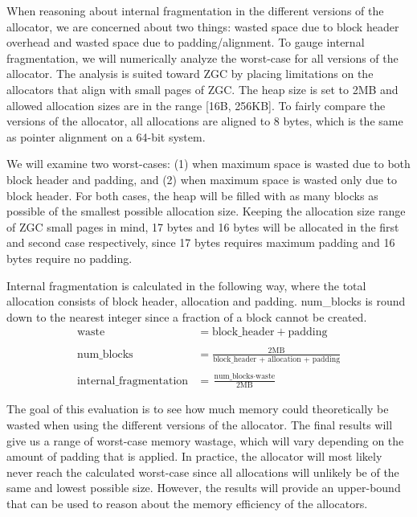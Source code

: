 When reasoning about internal fragmentation in the different versions of the allocator, we are concerned about two things: wasted space due to block header overhead and wasted space due to padding/alignment. To gauge internal fragmentation, we will numerically analyze the worst-case for all versions of the allocator. The analysis is suited toward ZGC by placing limitations on the allocators that align with small pages of ZGC. The heap size is set to 2MB and allowed allocation sizes are in the range [16B, 256KB]. To fairly compare the versions of the allocator, all allocations are aligned to 8 bytes, which is the same as pointer alignment on a 64-bit system.

We will examine two worst-cases: (1) when maximum space is wasted due to both block header and padding, and (2) when maximum space is wasted only due to block header. For both cases, the heap will be filled with as many blocks as possible of the smallest possible allocation size. Keeping the allocation size range of ZGC small pages in mind, 17 bytes and 16 bytes will be allocated in the first and second case respectively, since 17 bytes requires maximum padding and 16 bytes require no padding.

Internal fragmentation is calculated in the following way, where the total allocation consists of block header, allocation and padding. num\_blocks is round down to the nearest integer since a fraction of a block cannot be created.
\begin{align*}
    \text{waste} &= \text{block\_header} + \text{padding} \\\\
    \text{num\_blocks} &= \frac{2\text{MB}}{\text{block\_header + allocation + padding}} \\\\
    \text{internal\_fragmentation} &= \frac{\text{num\_blocks} \cdot \text{waste}}{2\text{MB}}
\end{align*}

The goal of this evaluation is to see how much memory could theoretically be wasted when using the different versions of the allocator. The final results will give us a range of worst-case memory wastage, which will vary depending on the amount of padding that is applied. In practice, the allocator will most likely never reach the calculated worst-case since all allocations will unlikely be of the same and lowest possible size. However, the results will provide an upper-bound that can be used to reason about the memory efficiency of the allocators.

